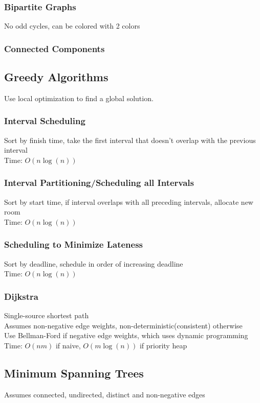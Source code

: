 \documentclass{article}
\begin{document}
\begin{multicols*}{2}
        \subsubsection*{Bipartite Graphs}
        No odd cycles, can be colored with 2 colors
        \subsubsection*{Connected Components}
        \subsection*{Greedy Algorithms}
        Use local optimization to find a global solution.
        \subsubsection*{Interval Scheduling}
        Sort by finish time, take the first interval that doesn't overlap
        with the previous interval\\
        Time: $O(n\log(n))$
        \subsubsection*{Interval Partitioning/Scheduling all Intervals}
        Sort by start time, if interval overlaps with all preceding intervals, allocate new room\\
        Time: $O(n\log(n))$
        \subsubsection*{Scheduling to Minimize Lateness}
        Sort by deadline, schedule in order of increasing deadline\\
        Time: $O(n\log(n))$
        \subsubsection*{Dijkstra}
        Single-source shortest path\\
        Assumes non-negative edge weights, non-deterministic(consistent) otherwise\\
        Use Bellman-Ford if negative edge weights, which uses dynamic programming\\
        Time: $O(nm)$ if naive, $O(m\log(n))$ if priority heap
        \subsection*{Minimum Spanning Trees}
        Assumes connected, undirected, distinct and non-negative edges\\

\end{multicols*}
\end{document}

